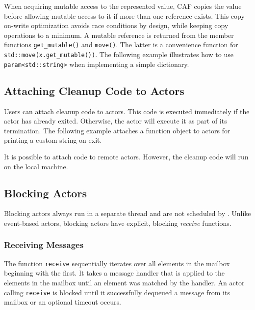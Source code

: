 When acquiring mutable access to the represented value, CAF copies the value before allowing mutable access to it if more than one reference exists. This copy-on-write optimization avoids race conditions by design, while keeping copy operations to a minimum. A mutable reference is returned from the member functions \lstinline^get_mutable()^ and \lstinline^move()^. The latter is a convenience function for \lstinline^std::move(x.get_mutable())^. The following example illustrates how to use \lstinline^param<std::string>^ when implementing a simple dictionary.



\subsection{Attaching Cleanup Code to Actors}
\label{attach}

Users can attach cleanup code to actors. This code is executed immediately if the actor has already exited. Otherwise, the actor will execute it as part of its termination. The following example attaches a function object to actors for printing a custom string on exit.



It is possible to attach code to remote actors. However, the cleanup code will run on the local machine.

\subsection{Blocking Actors}
\label{blocking-actors}

Blocking actors always run in a separate thread and are not scheduled by \lib. Unlike event-based actors, blocking actors have explicit, blocking \emph{receive} functions.

\subsubsection{Receiving Messages}

The function \lstinline^receive^ sequentially iterates over all elements in the mailbox beginning with the first.
It takes a message handler that is applied to the elements in the mailbox until an element was matched by the handler.
An actor calling \lstinline^receive^ is blocked until it successfully dequeued a message from its mailbox or an optional timeout occurs.

